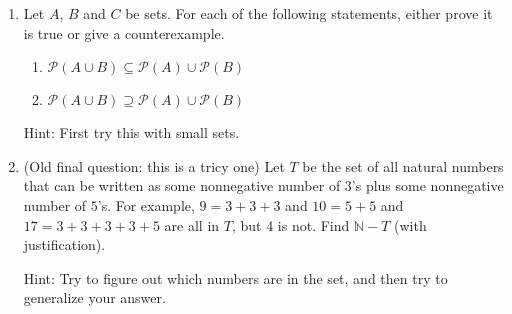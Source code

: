 \documentclass[12pt]{article}
\newcommand{\set}[1]{\left\{ #1 \right\}}
\newcommand{\soln}[1]{
\iftoggle{show}{
{\color{red} \textbf{Solution:}#1
}}{}
}
\begin{document}
\begin{enumerate}[resume]

\item
Let $A$, $B$  and $C$ be sets. For each of the following statements, either prove it is true or give a counterexample.
\begin{enumerate}
    \item $\mathcal{P}(A\cup B) \subseteq  \mathcal{P}(A)\cup \mathcal{P}(B)$
    \item $\mathcal{P}(A\cup B) \supseteq  \mathcal{P}(A)\cup \mathcal{P}(B)$
\end{enumerate}

Hint: First try this with small sets.

\item (Old final question: this is a tricy one) Let $T$ be the set of all natural numbers that can be written as some nonnegative
number of $3$’s plus some nonnegative number of $5$’s. For example, $9 = 3 + 3 + 3$ and
$10 = 5 + 5$ and $17 = 3 + 3 + 3 + 3 + 5$ are all in $T$, but $4$ is not. Find $\mathbb N-T$ (with
justification).

Hint: Try to figure out which numbers are in the set, and then try to generalize your answer.

%
%
%
%
%
%
%
%
%
%



\end{enumerate}
\end{document}
